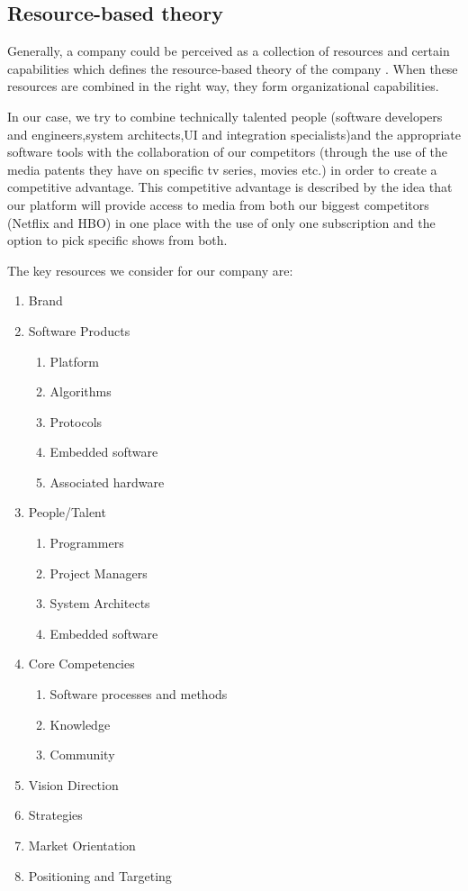 \subsection{Resource-based theory}

Generally, a company could be perceived as a collection of resources and certain capabilities which defines the resource-based theory of the company \cite[p. 13-14]{fiveForces}.
When these resources are combined in the right way, they form organizational capabilities.

In our case, we try to combine technically talented people (software developers and engineers,system architects,UI and integration specialists)and the appropriate software tools with the collaboration of our competitors (through the use of the media patents they have on specific tv series, movies etc.) in order to create a competitive advantage. This competitive advantage is described by the idea that our platform will provide access to media from both our biggest competitors (Netflix and HBO) in one place with the use of only one subscription and the option to pick specific shows from both.

The key resources we consider for our company are:

\begin{enumerate}
  \item Brand
  \item Software Products
  	\begin{enumerate}
   		\item Platform
   		\item Algorithms  	
    	\item Protocols
    	\item Embedded software
    	\item Associated hardware
  	\end{enumerate}
  \item People/Talent
  	\begin{enumerate}
      	\item Programmers
      	\item Project Managers
      	\item System Architects
      	\item Embedded software
    \end{enumerate}
  \item Core Competencies
  	\begin{enumerate}
        	\item Software processes and methods
        	\item Knowledge
        	\item Community
    \end{enumerate}
  \item Vision Direction
  \item Strategies
  \item Market Orientation
  \item Positioning and Targeting
\end{enumerate}

